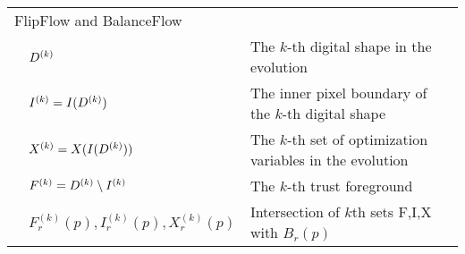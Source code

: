 \begin{tabular}{p{1cm}ll}
\multicolumn{3}{l}{FlipFlow and BalanceFlow}\\
& $D^{(k)}$ & The $k$-th digital shape in the evolution\\
& $I^{(k)} = I(D^{(k)})$ & The inner pixel boundary of the $k$-th digital shape\\
& $X^{(k)} = X(I(D^{(k)}))$ & The $k$-th set of optimization variables in the evolution\\
& $F^{(k)} = D^{(k)} \setminus I^{(k)}$ & The $k$-th trust foreground \\
& $F_r^{(k)}(p),I_r^{(k)}(p),X_r^{(k)}(p)$ & Intersection of $k$th sets F,I,X with $B_r(p)$\\[1em]

\end{tabular}
